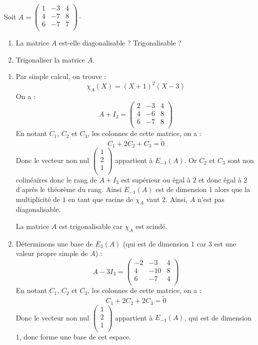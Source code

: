 \documentclass[a4paper,10pt]{report}
\begin{document}
\begin{Exa} Soit $A= \begin{pmatrix}
1 & -3 & 4 \\
4 & -7 & 8 \\
6 & -7 & 7 \\
\end{pmatrix}\cdot$

\begin{enumerate}
\item La matrice $A$ est-elle diagonalisable ? Trigonalisable ?
\item Trigonaliser la matrice $A$. 
\end{enumerate}
\end{Exa}

\corr 

\begin{enumerate}
\item Par simple calcul, on trouve :
$$ \chi_A(X) = (X+1)^2(X-3)$$
On a :
$$ A+I_3 =  \begin{pmatrix}
2 & -3 & 4 \\
4 & -6 & 8 \\
6 & -7 & 8 \\
\end{pmatrix}$$
En notant $C_1$, $C_2$ et $C_3$, les colonnes de cette matrice, on a :
$$ C_1+2C_2+C_3= \tilde{0}$$
Donc le vecteur non nul $\begin{pmatrix}
1 \\
2 \\
1 \\
\end{pmatrix}$ appartient à $E_{-1}(A)$. Or $C_2$ et $C_3$ sont non colinéaires donc le rang de $A+I_3$ est supérieur ou égal à $2$ et donc égal à $2$ d'après le théorème du rang. Ainsi $E_{-1}(A)$ est de dimension $1$ alors que la multiplicité de $1$ en tant que racine de $\chi_A$ vaut $2$. Ainsi, $A$ n'est pas diagonalisable.

\medskip

\noindent La matrice $A$ est trigonalisable car $\chi_A$ est scindé.
\item Déterminons une base de $E_3(A)$ (qui est de dimension $1$ car $3$ est une valeur propre simple de $A$) :
$$ A- 3I_3 = \begin{pmatrix}
-2 & -3 & 4 \\
4 & -10 & 8 \\
6 & -7 & 4 \\
\end{pmatrix}$$
En notant $C_1$, $C_2$ et $C_3$, les colonnes de cette matrice, on a :
$$ C_1+2C_2+2C_3= \tilde{0}$$
Donc le vecteur non nul $\begin{pmatrix}
1 \\
2 \\
1 \\
\end{pmatrix}$ appartient à $E_{-1}(A)$, qui est de dimension $1$, donc forme une base de cet espace. 


\end{enumerate}
\end{document}
